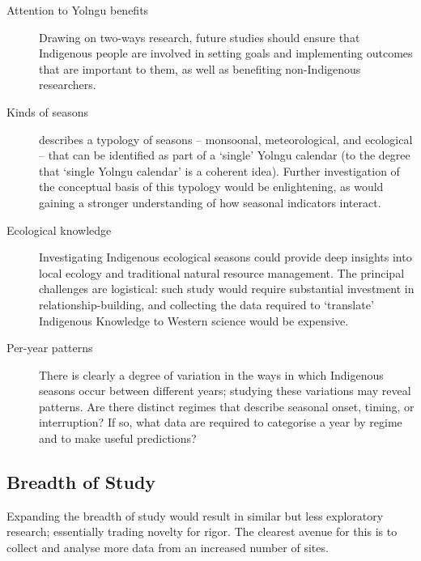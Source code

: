 \begin{description}
\item[Attention to Yolngu benefits]
    Drawing on two-ways research, future studies should ensure that Indigenous
    people are involved in setting goals and implementing outcomes that are
    important to them, as well as benefiting non-Indigenous researchers.

\item[Kinds of seasons]
     describes a typology of seasons -- monsoonal,
    meteorological, and ecological -- that can be identified as part of a
    `single' Yolngu calendar (to the degree that `single Yolngu calendar'
    is a coherent idea).  Further investigation of the conceptual basis of this typology would
    be enlightening, as would gaining a stronger understanding of how
    seasonal indicators interact.

\item[Ecological knowledge]
    Investigating Indigenous ecological seasons could provide deep insights
    into local ecology and traditional natural resource management. The
    principal challenges are logistical:  such study would require substantial
    investment in relationship-building, and collecting the data
    required to `translate' Indigenous Knowledge to Western science would
    be expensive.

\item[Per-year patterns]
    There is clearly a degree of variation in the ways in which Indigenous seasons occur between
    different years; studying these variations may reveal patterns.  Are there distinct
    regimes that describe seasonal onset, timing, or interruption?  If so, what
    data are required to categorise a year by regime and to make useful predictions?
\end{description}

\subsection{Breadth of Study}
Expanding the breadth of study would result in similar but less exploratory
research; essentially trading novelty for rigor.  The clearest avenue for
this is to collect and analyse more data from an increased number of sites.

